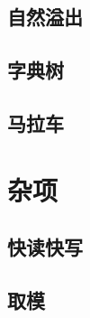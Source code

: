 \documentclass[10pt,a4paper]{article}
\begin{document}
\subsection{自然溢出}

\subsection{字典树}

\subsection{马拉车}

\section{杂项}
\subsection{快读快写}

\subsection{取模}

\end{document}
